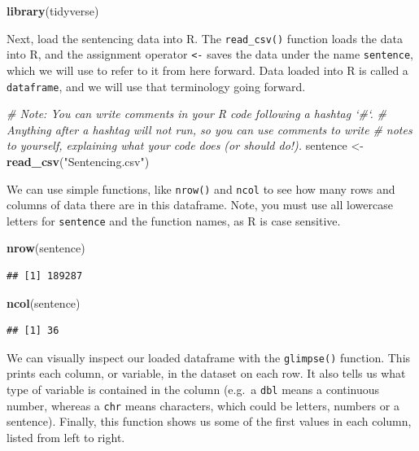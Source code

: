 \documentclass[]{article}
\newenvironment{Shaded}{\begin{snugshade}}{\end{snugshade}}
\newcommand{\KeywordTok}[1]{\textcolor[rgb]{0.13,0.29,0.53}{\textbf{#1}}}
\newcommand{\StringTok}[1]{\textcolor[rgb]{0.31,0.60,0.02}{#1}}
\newcommand{\CommentTok}[1]{\textcolor[rgb]{0.56,0.35,0.01}{\textit{#1}}}
\newcommand{\NormalTok}[1]{#1}
\begin{document}
\begin{Shaded}
\begin{Highlighting}[]
\KeywordTok{library}\NormalTok{(tidyverse)}
\end{Highlighting}
\end{Shaded}

Next, load the sentencing data into R. The \texttt{read\_csv()} function
loads the data into R, and the assignment operator \texttt{\textless{}-}
saves the data under the name \texttt{sentence}, which we will use to
refer to it from here forward. Data loaded into R is called a
\texttt{dataframe}, and we will use that terminology going forward.

\begin{Shaded}
\begin{Highlighting}[]
\CommentTok{# Note: You can write comments in your R code following a hashtag `#`. }
\CommentTok{# Anything after a hashtag will not run, so you can use comments to write }
\CommentTok{# notes to yourself, explaining what your code does (or should do!).}
\NormalTok{sentence <-}\StringTok{ }\KeywordTok{read_csv}\NormalTok{(}\StringTok{"Sentencing.csv"}\NormalTok{)}
\end{Highlighting}
\end{Shaded}

We can use simple functions, like \texttt{nrow()} and \texttt{ncol} to
see how many rows and columns of data there are in this dataframe. Note,
you must use all lowercase letters for \texttt{sentence} and the
function names, as R is case sensitive.

\begin{Shaded}
\begin{Highlighting}[]
\KeywordTok{nrow}\NormalTok{(sentence)}
\end{Highlighting}
\end{Shaded}

\begin{verbatim}
## [1] 189287
\end{verbatim}

\begin{Shaded}
\begin{Highlighting}[]
\KeywordTok{ncol}\NormalTok{(sentence)}
\end{Highlighting}
\end{Shaded}

\begin{verbatim}
## [1] 36
\end{verbatim}

We can visually inspect our loaded dataframe with the \texttt{glimpse()}
function. This prints each column, or variable, in the dataset on each
row. It also tells us what type of variable is contained in the column
(e.g.~a \texttt{dbl} means a continuous number, whereas a \texttt{chr}
means characters, which could be letters, numbers or a sentence).
Finally, this function shows us some of the first values in each column,
listed from left to right.
\end{document}
